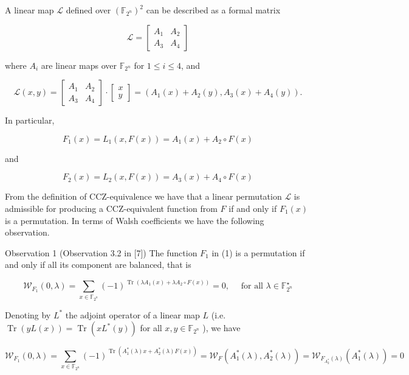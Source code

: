 \documentclass[10pt]{article}
\begin{document}
A linear map $\mathscr{L}$ defined over $\left(\mathbb{F}_{2^{n}}\right)^{2}$ can be described as a formal matrix

$$
\mathscr{L}=\left[\begin{array}{ll}
A_{1} & A_{2} \\
A_{3} & A_{4}
\end{array}\right]
$$

where $A_{i}$ are linear maps over $\mathbb{F}_{2^{n}}$ for $1 \leq i \leq 4$, and

$$
\mathscr{L}(x, y)=\left[\begin{array}{ll}
A_{1} & A_{2} \\
A_{3} & A_{4}
\end{array}\right] \cdot\left[\begin{array}{l}
x \\
y
\end{array}\right]=\left(A_{1}(x)+A_{2}(y), A_{3}(x)+A_{4}(y)\right) .
$$

In particular,


\begin{equation*}
F_{1}(x)=L_{1}(x, F(x))=A_{1}(x)+A_{2} \circ F(x) \tag{1}
\end{equation*}


and


\begin{equation*}
F_{2}(x)=L_{2}(x, F(x))=A_{3}(x)+A_{4} \circ F(x) \tag{2}
\end{equation*}


From the definition of CCZ-equivalence we have that a linear permutation $\mathscr{L}$ is admissible for producing a CCZ-equivalent function from $F$ if and only if $F_{1}(x)$ is a permutation. In terms of Walsh coefficients we have the following observation.

Observation 1 (Observation 3.2 in [7]) The function $F_{1}$ in (1) is a permutation if and only if all its component are balanced, that is

$$
\mathscr{W}_{F_{1}}(0, \lambda)=\sum_{x \in \mathbb{F}_{2^{n}}}(-1)^{\operatorname{Tr}\left(\lambda A_{1}(x)+\lambda A_{2} \circ F(x)\right)}=0, \quad \text { for all } \lambda \in \mathbb{F}_{2^{n}}^{\star}
$$

Denoting by $L^{*}$ the adjoint operator of a linear map $L$ (i.e. $\operatorname{Tr}(y L(x))=\operatorname{Tr}\left(x L^{*}(y)\right)$ for all $x, y \in \mathbb{F}_{2^{n}}$ ), we have


\begin{equation*}
\mathscr{W}_{F_{1}}(0, \lambda)=\sum_{x \in \mathbb{F}_{2^{n}}}(-1)^{\operatorname{Tr}\left(A_{1}^{*}(\lambda) x+A_{2}^{*}(\lambda) F(x)\right)}=\mathscr{W}_{F}\left(A_{1}^{*}(\lambda), A_{2}^{*}(\lambda)\right)=\mathscr{W}_{F_{A_{2}^{*}}(\lambda)}\left(A_{1}^{*}(\lambda)\right)=0 \tag{3}
\end{equation*}
\end{document}
